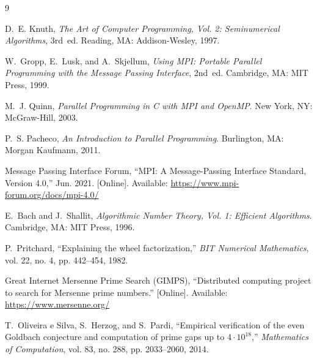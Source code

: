 \documentclass[conference]{IEEEtran}
\begin{document}
\begin{thebibliography}{9}

D.~E. Knuth,
\textit{The Art of Computer Programming, Vol. 2: Seminumerical Algorithms},
3rd~ed.
Reading, MA: Addison-Wesley, 1997.

W.~Gropp, E.~Lusk, and A.~Skjellum,
\textit{Using MPI: Portable Parallel Programming with the Message Passing Interface},
2nd~ed.
Cambridge, MA: MIT Press, 1999.

M.~J. Quinn,
\textit{Parallel Programming in C with MPI and OpenMP}.
New York, NY: McGraw-Hill, 2003.

P.~S. Pacheco,
\textit{An Introduction to Parallel Programming}.
Burlington, MA: Morgan Kaufmann, 2011.

Message Passing Interface Forum,
``MPI: A Message-Passing Interface Standard, Version 4.0,''
Jun. 2021.
[Online]. Available: \url{https://www.mpi-forum.org/docs/mpi-4.0/}

E.~Bach and J.~Shallit,
\textit{Algorithmic Number Theory, Vol. 1: Efficient Algorithms}.
Cambridge, MA: MIT Press, 1996.

P.~Pritchard,
``Explaining the wheel factorization,''
\textit{BIT Numerical Mathematics}, vol. 22, no. 4, pp. 442--454, 1982.

Great Internet Mersenne Prime Search (GIMPS),
``Distributed computing project to search for Mersenne prime numbers.''
[Online]. Available: \url{https://www.mersenne.org/}

T.~Oliveira e Silva, S.~Herzog, and S.~Pardi,
``Empirical verification of the even Goldbach conjecture and computation of
prime gaps up to $4\cdot10^{18}$,''
\textit{Mathematics of Computation}, vol. 83, no. 288, pp. 2033--2060, 2014.

\end{thebibliography}
\end{document}
